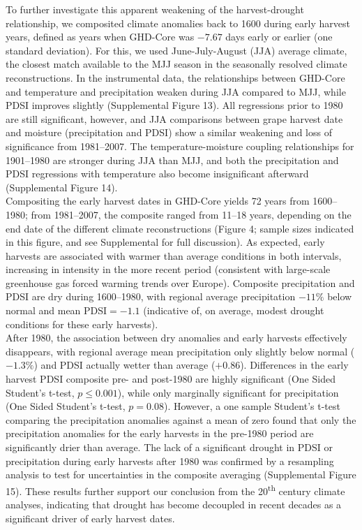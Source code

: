 \documentclass[final]{nature}
\begin{document}
\indent To further investigate this apparent weakening of the harvest-drought relationship, we composited climate anomalies back to 1600 during early harvest years, defined as years when GHD-Core was $-7.67$ days early or earlier (one standard deviation). For this, we used June-July-August (JJA) average climate, the closest match available to the MJJ season in the seasonally resolved climate reconstructions. In the instrumental data, the relationships between GHD-Core and temperature and precipitation weaken during JJA compared to MJJ, while PDSI improves slightly (Supplemental Figure 13). All regressions prior to 1980 are still significant, however, and JJA comparisons between grape harvest date and moisture (precipitation and PDSI) show a similar weakening and loss of significance from 1981--2007. The temperature-moisture coupling relationships for 1901--1980 are stronger during JJA than MJJ, and both the precipitation and PDSI regressions with temperature also become insignificant afterward (Supplemental Figure 14).\\ 
\indent Compositing the early harvest dates in GHD-Core yields 72 years from 1600--1980; from 1981--2007, the composite ranged from 11--18 years, depending on the end date of the different climate reconstructions (Figure 4; sample sizes indicated in this figure, and see Supplemental for full discussion). As expected, early harvests are associated with warmer than average conditions in both intervals, increasing in intensity in the more recent period (consistent with large-scale greenhouse gas forced warming trends over Europe). Composite precipitation and PDSI are dry during 1600--1980, with regional average precipitation $-11\%$ below normal and mean PDSI$=-1.1$ (indicative of, on average, modest drought conditions for these early harvests).\\
\indent After 1980, the association between dry anomalies and early harvests effectively disappears, with regional average mean precipitation only slightly below normal ($-1.3\%$) and PDSI actually wetter than average ($+0.86$). Differences in the early harvest PDSI composite pre- and post-1980 are highly significant (One Sided Student's t-test, $p\le0.001$), while only marginally significant for precipitation (One Sided Student's t-test, $p=0.08$). However, a one sample Student's t-test comparing the precipitation anomalies against a mean of zero found that only the precipitation anomalies for the early harvests in the pre-1980 period are significantly drier than average. The lack of a significant drought in PDSI or precipitation during early harvests after 1980 was confirmed by a resampling analysis to test for uncertainties in the composite averaging (Supplemental Figure 15). These results further support our conclusion from the 20\textsuperscript{th} century climate analyses, indicating that drought has become decoupled in recent decades as a significant driver of early harvest dates.\\
\end{document}
